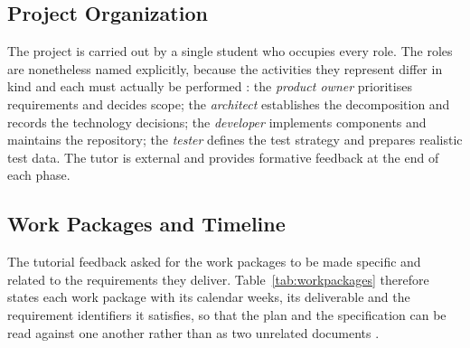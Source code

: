 \documentclass[a4paper,11pt]{article}
\begin{document}
\subsection{Project Organization}\label{subsec:organization}

The project is carried out by a single student who occupies every role. The
roles are nonetheless named explicitly, because the activities they represent
differ in kind and each must actually be performed \citep{Sommerville2020}: the
\textit{product owner} prioritises requirements and decides scope; the
\textit{architect} establishes the decomposition and records the technology
decisions; the \textit{developer} implements components and maintains the
repository; the \textit{tester} defines the test strategy and prepares realistic
test data. The tutor is external and provides formative feedback at the end of
each phase.

\subsection{Work Packages and Timeline}\label{subsec:plan}

The tutorial feedback asked for the work packages to be made specific and
related to the requirements they deliver. Table~\ref{tab:workpackages} therefore
states each work package with its calendar weeks, its deliverable and the
requirement identifiers it satisfies, so that the plan and the specification can
be read against one another rather than as two unrelated documents
\citep{Sommerville2020}.
\end{document}
